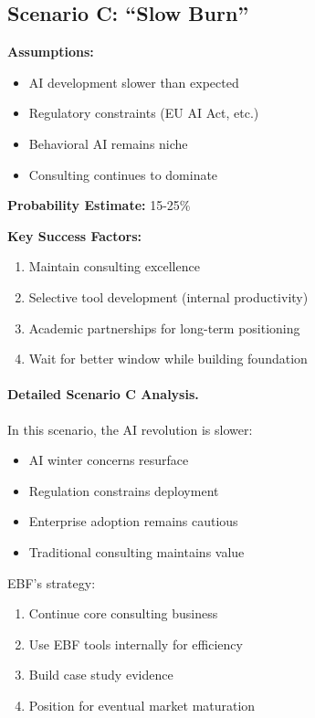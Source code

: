 \subsection{Scenario C: ``Slow Burn''}

\begin{tcolorbox}[colback=gray!5!white, colframe=gray!75!black,
    title=Scenario C: Slow Burn]

\textbf{Assumptions:}
\begin{itemize}[nosep]
\item AI development slower than expected
\item Regulatory constraints (EU AI Act, etc.)
\item Behavioral AI remains niche
\item Consulting continues to dominate
\end{itemize}

\textbf{Probability Estimate:} 15-25\%

\textbf{Key Success Factors:}
\begin{enumerate}[nosep]
\item Maintain consulting excellence
\item Selective tool development (internal productivity)
\item Academic partnerships for long-term positioning
\item Wait for better window while building foundation
\end{enumerate}

\end{tcolorbox}

\paragraph{Detailed Scenario C Analysis.}

In this scenario, the AI revolution is slower:
\begin{itemize}
\item AI winter concerns resurface
\item Regulation constrains deployment
\item Enterprise adoption remains cautious
\item Traditional consulting maintains value
\end{itemize}

EBF's strategy:
\begin{enumerate}
\item Continue core consulting business
\item Use EBF tools internally for efficiency
\item Build case study evidence
\item Position for eventual market maturation
\end{enumerate}


